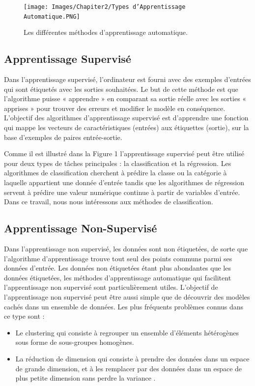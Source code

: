 \begin{figure}[h]
\centering
\texttt{[image: Images/Chapiter2/Types d’Apprentissage Automatique.PNG]}
\caption{Les différentes méthodes d'apprentissage automatique.}
\label{fig:01}
\end{figure}

\subsection{Apprentissage Supervisé }
Dans l'apprentissage supervisé, l'ordinateur est fourni avec des exemples d'entrées qui sont étiquetés avec les sorties souhaitées. Le but de cette méthode est que l'algorithme puisse « apprendre » en comparant sa sortie réelle avec les sorties « apprises » pour trouver des erreurs et modifier le modèle en conséquence. 
L'objectif des algorithmes d'apprentissage supervisé est d'apprendre une fonction qui mappe les vecteurs de caractéristiques (entrées) aux étiquettes (sortie), sur la base d'exemples de paires entrée-sortie.  

Comme il est illustré dans la Figure 1 l’apprentissage supervisé peut être utilisé pour deux types de tâches principales : la classification et la régression. 
Les algorithmes de classification cherchent à prédire la classe ou la catégorie à laquelle appartient une donnée d'entrée tandis que les algorithmes de régression servent à prédire une valeur numérique continue à partir de variables d'entrée. Dans ce travail, nous nous intéressons aux méthodes de classification.
\subsection{Apprentissage Non-Supervisé  }
Dans l'apprentissage non supervisé, les données sont non étiquetées, de sorte que l'algorithme d'apprentissage trouve tout seul des points communs parmi ses données d'entrée. Les données non étiquetées étant plus abondantes que les données étiquetées, les méthodes d'apprentissage automatique qui facilitent l'apprentissage non supervisé sont particulièrement utiles.
L'objectif de l'apprentissage non supervisé peut être aussi simple que de découvrir des modèles cachés dans un ensemble de données.
Les plus fréquents problèmes connus dans ce type sont :
\begin{itemize}
\item Le clustering qui consiste à regrouper un ensemble d’éléments hétérogènes sous forme de sous-groupes homogènes.

\item La réduction de dimension qui consiste à prendre des données dans un espace de grande dimension, et à les remplacer par des données dans un espace de plus petite dimension sans perdre la variance .
\end{itemize}


